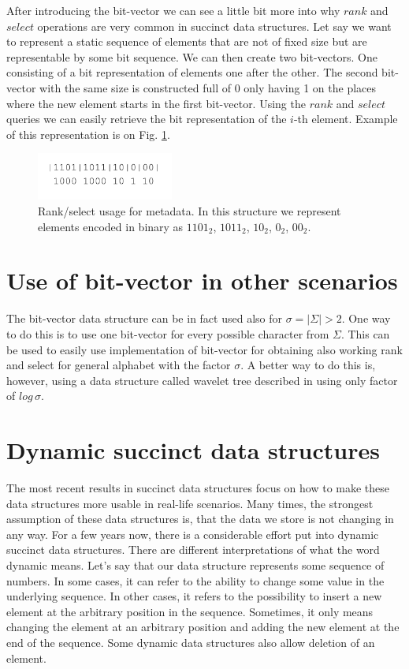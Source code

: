 After introducing the bit-vector we can see a little bit more into why $rank$ and $select$ operations are very common in succinct data structures. Let say we want to represent a static sequence of elements that are not of fixed size but are representable by some bit sequence.
We can then create two bit-vectors. One consisting of a bit representation of elements one after the other.
The second bit-vector with the same size is constructed full of 0 only having 1 on the places where the new element starts in the first bit-vector.
Using the $rank$ and $select$ queries we can easily retrieve the bit representation of the $i$-th element.
Example of this representation is on Fig. \ref{obr:obr_rank_select}.

\begin{figure}
\centerline{\includegraphics[width=0.4\textwidth]{images/obr_rank_select}}
\caption[Rank select usage in representation of sequence of elements with different size]{Rank/select usage for metadata. In this structure we represent elements encoded in binary as $1101_2$, $1011_2$, $10_2$, $0_2$, $00_2$.}
\label{obr:obr_rank_select}
\end{figure}

\section{Use of bit-vector in other scenarios}

The bit-vector data structure can be in fact used also for $\sigma = |\Sigma|>2$. One way to do this is to use one bit-vector for every possible character from $\Sigma$. This can be used to easily use implementation of bit-vector for obtaining also working rank and select for general alphabet with the factor $\sigma$. A better way to do this is, however, using a data structure called wavelet tree described in \cite{grossi2003high} using only factor of $log\,\sigma$.

\section{Dynamic succinct data structures}

The most recent results in succinct data structures focus on how to make these data structures more usable in real-life scenarios. Many times, the
strongest assumption of these data structures is, that the data we store is not changing in any way. For a few years now, there is a considerable effort put into dynamic succinct data structures. There are different interpretations of what the word dynamic means. Let's say that our data structure represents some sequence of numbers. In some cases, it can refer to the ability to change some value in the underlying sequence. In other cases, it refers to the possibility to insert a new element at the arbitrary position in the sequence. Sometimes, it only means changing the element at an arbitrary position and adding the new element at the end of the sequence. Some dynamic data structures also allow deletion of an element.

